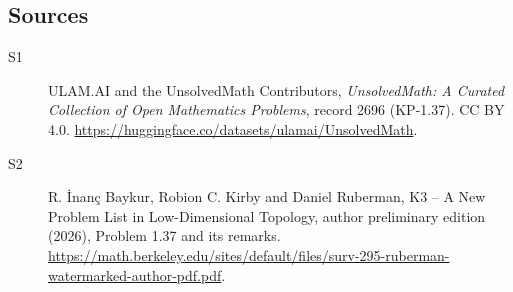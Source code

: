 \documentclass[11pt]{article}
\begin{document}
\subsection{Sources}
\begin{description}
\item[\hypertarget{source:2696:1}{S1}] ULAM.AI and the UnsolvedMath Contributors, \emph{UnsolvedMath: A Curated Collection of Open Mathematics Problems}, record 2696 (KP-1.37). CC BY 4.0. \url{https://huggingface.co/datasets/ulamai/UnsolvedMath}.
\item[\hypertarget{source:2696:2}{S2}] R. \.{I}nan\c{c} Baykur, Robion C. Kirby and Daniel Ruberman, K3 -- A New Problem List in Low-Dimensional Topology, author preliminary edition (2026), Problem 1.37 and its remarks. \url{https://math.berkeley.edu/sites/default/files/surv-295-ruberman-watermarked-author-pdf.pdf}.
\end{description}
\label{end:2696}
\end{document}
